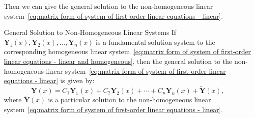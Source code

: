 \documentclass[11pt]{../../TexTemplate/elegantbook}
\begin{document}
Then we can give the general solution to
the non-homogeneous linear system~\eqref{eq:matrix form of system of first-order linear equations - linear}.
\begin{theorem}{General Solution to Non-Homogeneous Linear Systems}\label{theorem:general solution to non-homogeneous linear systems}
    If \(\mathbf{Y}_{1}(x), \mathbf{Y}_{2}(x), \ldots, \mathbf{Y}_{n}(x)\) is a fundamental solution system to 
    the corresponding homogeneous linear 
    system~\eqref{eq:matrix form of system of first-order linear equations - linear and homogeneous},
    then the general solution to the non-homogeneous linear 
    system~\eqref{eq:matrix form of system of first-order linear equations - linear} is given by:
    \[
    \mathbf{Y}(x) = C_{1} \mathbf{Y}_{1}(x) + C_{2} \mathbf{Y}_{2}(x) + \cdots + C_{n} \mathbf{Y}_{n}(x) + \tilde{\mathbf{Y}}(x),
    \]
    where \(\tilde{\mathbf{Y}}(x)\) is a particular solution to the non-homogeneous linear 
    system~\eqref{eq:matrix form of system of first-order linear equations - linear}.
\end{theorem}
\end{document}
